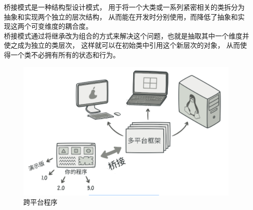 桥接模式是一种结构型设计模式， 用于将一个大类或一系列紧密相关的类拆分为抽象和实现两个独立的层次结构， 从而能在开发时分别使用，而降低了抽象和实现这两个可变维度的耦合度。\\

桥接模式通过将继承改为组合的方式来解决这个问题，也就是抽取其中一个维度并使之成为独立的类层次， 这样就可以在初始类中引用这个新层次的对象， 从而使得一个类不必拥有所有的状态和行为。

\begin{figure}[H]
    \centering
    \includegraphics{img/Chapter4/4-8/1.png}
    \caption{跨平台程序}
\end{figure}

\vspace{0.5cm}

\\

